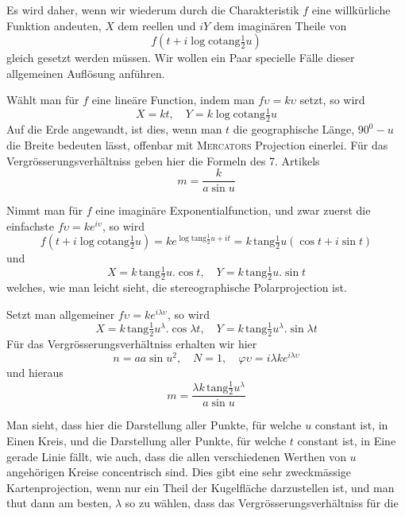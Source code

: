 \par\indent{}%
Es wird daher, wenn wir wiederum durch die Charakteristik \(f\) eine willkürliche Funktion andeuten, \(X\) dem reellen und \(iY\) dem imaginären Theile von
\[
f(t+i\log\mathrm{cotang}\tfrac{1}{2}u)
\]
\noindent gleich gesetzt werden müssen. Wir wollen ein Paar specielle Fälle dieser allgemeinen Auflösung anführen.

Wählt man für \(f\) eine lineäre Function, indem man \(f\upsilon=k\upsilon\) setzt, so wird
\[
X=kt,\quad Y=k\log\mathrm{cotang}\tfrac{1}{2}u
\]
\noindent Auf die Erde angewandt, ist dies, wenn man \(t\) die geographische Länge, \(90^0-u\) die Breite bedeuten lässt, offenbar mit \textsc{Mercators} Projection einerlei. Für das Vergrösserungsverhältniss geben hier die Formeln des 7. Artikels
\[
m=\frac{k}{a\sin u}
\]

Nimmt man für \(f\) eine imaginäre Exponentialfunction, und zwar zuerst die einfachste \(f\upsilon=ke^{i\upsilon}\), so wird
\[
f(t+i\log\mathrm{cotang}\tfrac{1}{2}u)=ke^{\log\mathrm{tang}\frac{1}{2}u+it}=k\,\mathrm{tang}\tfrac{1}{2}u(\cos t+i\sin t)
\]
\noindent und
\[
X=k\,\mathrm{tang}\tfrac{1}{2}u\mathord{.}\cos t,\quad
Y=k\,\mathrm{tang}\tfrac{1}{2}u\mathord{.}\sin t
\]
\noindent welches, wie man leicht sieht, die stereographische Polarprojection ist.

Setzt man allgemeiner \(f\upsilon=ke^{i\lambda\upsilon}\), so wird
\[
X=k\,\mathrm{tang}\tfrac{1}{2}u^{\lambda}\mathord{.}\cos\lambda t,\quad
Y=k\,\mathrm{tang}\tfrac{1}{2}u^{\lambda}\mathord{.}\sin\lambda t
\]
\noindent Für das Vergrösserungsverhältniss erhalten wir hier
\[
n=aa\sin u^2,\quad N=1,\quad\varphi\upsilon=i\lambda ke^{i\lambda\upsilon}
\]
\noindent und hieraus
\[
m=\frac{\lambda k\,\mathrm{tang}\frac{1}{2}u^{\lambda}}{a\sin u}
\]

Man sieht, dass hier die Darstellung aller Punkte, für welche \(u\) constant ist, in Einen Kreis, und die Darstellung aller Punkte, für welche \(t\) constant ist, in Eine gerade Linie fällt, wie auch, dass die allen verschiedenen Werthen von \(u\) angehörigen Kreise concentrisch sind. Dies gibt eine sehr zweckmässige Kartenprojection, wenn nur ein Theil der Kugelfläche darzustellen ist, und man thut dann am besten, \(\lambda\) so zu wählen, dass das Vergrösserungsverhältniss für die

